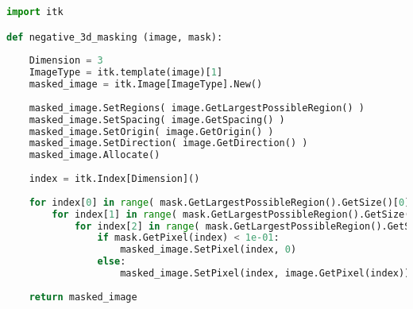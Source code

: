 \documentclass{standalone}
\begin{document}
\lstset{style=python}
	\begin{lstlisting}[language=python, caption = Masking Function, label=negative_masking]
import itk

def negative_3d_masking (image, mask):
    
    Dimension = 3
    ImageType = itk.template(image)[1]
    masked_image = itk.Image[ImageType].New()
    
    masked_image.SetRegions( image.GetLargestPossibleRegion() )
    masked_image.SetSpacing( image.GetSpacing() )
    masked_image.SetOrigin( image.GetOrigin() )
    masked_image.SetDirection( image.GetDirection() )
    masked_image.Allocate()
    
    index = itk.Index[Dimension]()
    
    for index[0] in range( mask.GetLargestPossibleRegion().GetSize()[0] ):
        for index[1] in range( mask.GetLargestPossibleRegion().GetSize()[1] ):
            for index[2] in range( mask.GetLargestPossibleRegion().GetSize()[2] ):
                if mask.GetPixel(index) < 1e-01:
                    masked_image.SetPixel(index, 0)
                else: 
                    masked_image.SetPixel(index, image.GetPixel(index))
    
    return masked_image


\end{lstlisting}
\end{document}

